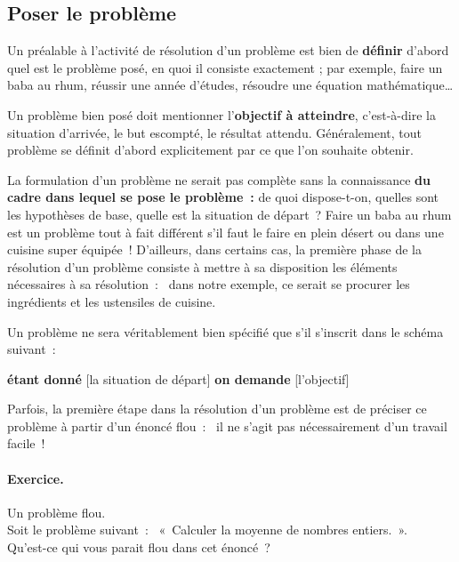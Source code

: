 		\subsection{Poser le problème}
		
			Un préalable à l’activité de résolution d’un problème 
			est bien de \textbf{définir} d’abord 
			quel est le problème posé, 
			en quoi il consiste exactement ; 
			par exemple, faire un baba au rhum, 
			réussir une année d’études, 
			résoudre une équation mathématique\dots
			
			Un problème bien posé doit mentionner 
			l’\textbf{objectif à atteindre},
			c’est-à-dire la situation d’arrivée, 
			le but escompté, le résultat attendu. 
			Généralement, tout problème se définit d’abord explicitement
			par ce que l’on souhaite obtenir.
			
			La formulation d’un problème ne serait pas complète 
			sans la connaissance
			\textbf{du cadre dans lequel se pose le problème~:}
			de quoi dispose-t-on, quelles sont les hypothèses de base, 
			quelle est la situation de départ~? 
			Faire un baba au rhum est un problème tout à fait différent 
			s’il faut le faire en plein désert 
			ou dans une cuisine super équipée~! 
			D’ailleurs, dans certains cas, 
			la première phase de la résolution d’un problème 
			consiste à mettre à sa disposition 
			les éléments nécessaires à sa résolution~:~
			dans notre exemple, 
			ce serait se procurer les ingrédients 
			et les ustensiles de cuisine.
		
			Un problème ne sera véritablement bien spécifié 
			que s’il s’inscrit dans le schéma suivant~:
			
			\begin{center}
			\begin{Ovalbox}
				{\textbf{étant donné} [la situation de départ] 
				\textbf{on demande} [l’objectif]}
			\end{Ovalbox}
			\end{center}
		
			Parfois, la première étape dans la résolution d’un problème 
			est de préciser ce problème à partir d’un énoncé flou~:~
			il ne s’agit pas nécessairement d’un travail facile~!
	
			\begin{Emphase}
				\paragraph{Exercice.} Un problème flou.\\
				Soit le problème suivant~:~
				«~Calculer la moyenne de nombres entiers.~».
				\\Qu’est-ce qui vous parait flou dans cet énoncé~?
			\end{Emphase}
			
